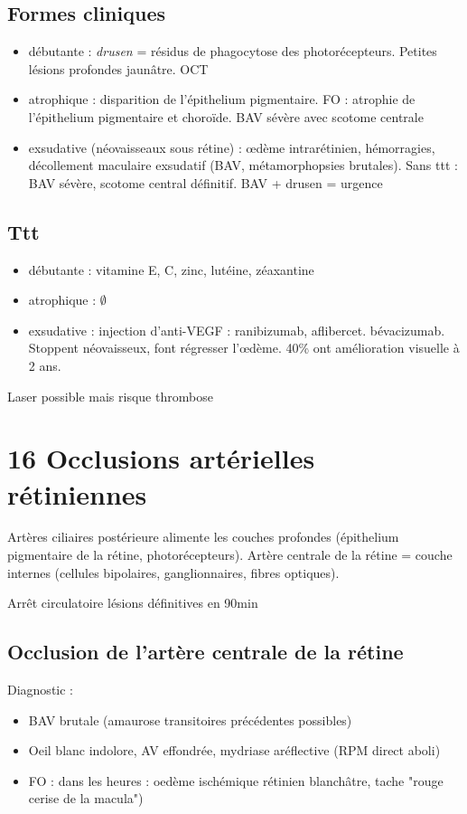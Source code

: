 \documentclass[11pt]{article}
\begin{document}
\subsection{Formes cliniques}
\label{sec:org323b6ac}
\begin{itemize}
\item débutante : \emph{drusen} = résidus de phagocytose des photorécepteurs. Petites
lésions profondes jaunâtre. OCT
\item atrophique : disparition de l'épithelium pigmentaire. FO : atrophie de
l'épithelium pigmentaire et choroïde. BAV sévère avec scotome centrale
\item exsudative (néovaisseaux sous rétine) : \oe{}dème intrarétinien, hémorragies,
décollement maculaire exsudatif (BAV, métamorphopsies brutales). Sans ttt :
BAV sévère, scotome central définitif. BAV + drusen = urgence \skull
\end{itemize}

\subsection{Ttt}
\label{sec:org4f25872}
\begin{itemize}
\item débutante : vitamine E, C, zinc, lutéine, zéaxantine
\item atrophique : \(\emptyset\)
\item exsudative : injection d'anti-VEGF : ranibizumab,
aflibercet. bévacizumab. Stoppent néovaisseux, font régresser l'\oe{}dème. 40\%
ont amélioration visuelle à 2 ans.
\end{itemize}
Laser possible mais risque thrombose
\section{16 Occlusions artérielles rétiniennes}
\label{sec:orgb84f8eb}
Artères ciliaires postérieure alimente les couches profondes (épithelium
pigmentaire de la rétine, photorécepteurs). 
Artère centrale de la rétine = couche internes (cellules bipolaires,
ganglionnaires, fibres optiques).

Arrêt circulatoire \thus lésions définitives en 90min \danger

\subsection{Occlusion de l'artère centrale de la rétine}
\label{sec:orge57b3a1}
Diagnostic : 
\begin{itemize}
\item BAV brutale (amaurose transitoires précédentes possibles)
\item Oeil blanc indolore, AV effondrée, mydriase aréflective (RPM direct aboli)
\item FO : dans les heures : oedème ischémique rétinien blanchâtre, tache "rouge
cerise de la macula")
\end{itemize}
\end{document}
